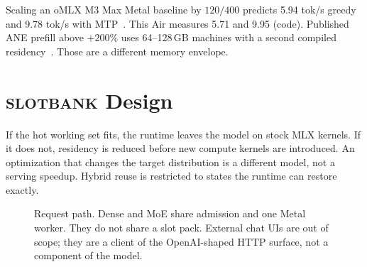 \documentclass[11pt]{article}
\theoremstyle{definition}
\newcommand{\slotbank}{\textsc{slotbank}}
\begin{document}
Scaling an oMLX M3 Max Metal baseline by $120/400$ predicts 5.94 tok/s greedy and 9.78 tok/s with MTP~\citep{omlx2874}. This Air measures 5.71 and 9.95 (code). Published ANE prefill above ${+}200\%$ uses 64--128\,GB machines with a second compiled residency~\citep{weschera2026}. Those are a different memory envelope.

\section{\slotbank{} Design}
\label{sec:design}

If the hot working set fits, the runtime leaves the model on stock MLX kernels. If it does not, residency is reduced before new compute kernels are introduced. An optimization that changes the target distribution is a different model, not a serving speedup. Hybrid reuse is restricted to states the runtime can restore exactly.

\begin{figure}[t]
\centering
{}
\caption{Request path. Dense and MoE share admission and one Metal worker. They do not share a slot pack. External chat UIs are out of scope; they are a client of the OpenAI-shaped HTTP surface, not a component of the model.}
\label{fig:arch}
\end{figure}
\end{document}
